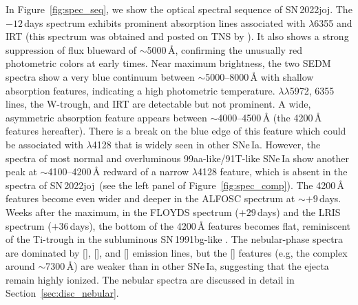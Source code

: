 \documentclass[twocolumn]{aastex631}
\newcommand{\sn}{SN\,2022joj}
\begin{document}
\begin{CJK*}{UTF8}{gbsn}
In Figure~\ref{fig:spec_seq}, we show the optical spectral sequence of \sn. The $-12$\,days spectrum exhibits prominent absorption lines associated with  $\lambda$6355 and  IRT (this spectrum was obtained and posted on TNS by \citealt{Newsome_2022TNSCR}). It also shows a strong suppression of flux blueward of $\sim$5000\,\r{A}, confirming the unusually red photometric colors at early times. Near maximum brightness, the two SEDM spectra show a very blue continuum between $\sim$5000--8000\,\r{A} with shallow absorption features, indicating a high photometric temperature.  $\lambda\lambda$5972, 6355 lines, the  W-trough, and  IRT are detectable but not prominent. A wide, asymmetric absorption feature appears between $\sim$4000--4500\,\r{A} (the 4200\,\r{A} features hereafter). There is a break on the blue edge of this feature which could be associated with  $\lambda$4128 that is widely seen in other SNe\,Ia. However, the spectra of most normal and overluminous 99aa-like/91T-like SNe\,Ia show another peak at $\sim$4100--4200\,\r{A} redward of a narrow  $\lambda$4128 feature, which is absent in the spectra of \sn\ (see the left panel of Figure~\ref{fig:spec_comp}). The 4200\,\r{A} features become even wider and deeper in the ALFOSC spectrum at $\sim$$+9$\,days. Weeks after the maximum, in the FLOYDS spectrum ($+29$\,days) and the LRIS spectrum ($+36$\,days), the bottom of the 4200\,\r{A} features becomes flat, reminiscent of the Ti-trough in the subluminous SN\,1991bg-like \citep[91bg-like;][]{Filippenko_91bg_1992,Leibundgut_91bg_1993}. The nebular-phase spectra are dominated by [], [], and [] emission lines, but the [] features (e.g, the complex around $\sim$7300\,\r{A}) are weaker than in other SNe\,Ia, suggesting that the ejecta remain highly ionized. The nebular spectra are discussed in detail in Section~\ref{sec:disc_nebular}.


\end{CJK*}
\end{document}
